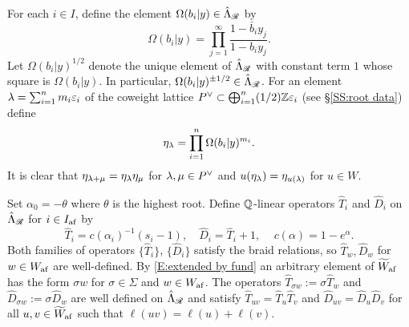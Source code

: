\documentclass[a4paper]{amsart}
\newcommand{\ike}[1]{\todo[size=\tiny,color=blue!30]{#1}}
\theoremstyle{remark}
\newtheorem{remark}[thm]{Remark}
\numberwithin{equation}{section}
\begin{document}
For each $i\in I$, define the element
$\Omega(b_i|y)\in\hat{\Lambda}_{\mathscr{R}}$ by
\begin{equation}
\Omega(b_i|y) =\prod_{j=1}^\infty \frac{1-\bar{b}_iy_j}{
1-b_i y_j
}.
\end{equation}
Let $\Omega(b_i| y)^{1/2}$ denote the unique element of
$\hat{\Lambda}_{\mathscr{R}}$ with constant term $1$ whose square is
$\Omega(b_i| y)$. 
In particular,
$\Omega(b_i| y)^{\pm 1/2}\in\hat{\Lambda}_{\mathscr{R}}$.
For an element $\lambda=\sum_{i=1}^n m_i \varepsilon_i$ of the coweight lattice $P^\lor\subset \bigoplus_{i=1}^n (1/2) \mathbb{Z} \varepsilon_i$ 
(see \S \ref{SS:root data}) define 
\begin{align}
  \eta_{\lambda} = \prod_{i=1}^n \Omega(b_i| y)^{m_i}.
\end{align}
It is clear that $\eta_{\lambda+\mu} = \eta_{\lambda} \eta_{\mu}$ for $\lambda,\mu\in P^\lor$
and $u(\eta_{\lambda})=\eta_{u(\lambda)}$ for $u\in W$.




Set $\alpha_0=-\theta$ where $\theta$ is the highest root.
Define $\mathbb{Q}$-linear operators $\hat{T}_i$ and
$\hat{D}_i$ on $\hat{\Lambda}_{\mathscr{R}}$ for $i\in I_{\mathrm{af}}$ by
\begin{equation}\label{E:TDc}
\hat{T}_i=c(\alpha_i)^{-1}(s_i-1),\quad
\hat{D}_i=\hat{T}_i+1,\,\quad  c(\alpha)=1-e^{\alpha}.
\end{equation}
Both families of operators 
$\{\hat{T}_i\}$, $\{\hat{D}_i\}$ satisfy the braid relations, so $\hat{T}_w, \hat{D}_w$ for $w\in W_{\mathrm{af}}$ are well-defined. By 
\eqref{E:extended by fund} an arbitrary element of $\widetilde{W}_{\mathrm{af}}$ has the form
$\sigma w$ for $\sigma\in\Sigma$ and $w\in W_{\mathrm{af}}$.
The operators $\hat{T}_{\sigma w}:=\sigma\hat{T}_w$ and $\hat{D}_{\sigma w}:=\sigma\hat{D}_w$
are well defined on $\hat{\Lambda}_{\mathscr{R}}$ and satisfy $\hat{T}_{uv}=\hat{T}_u\hat{T}_v$ and
$\hat{D}_{uv}=\hat{D}_u\hat{D}_v$ for all $u,v\in\widetilde{W}_{\mathrm{af}}$ such that $\ell(uv)=\ell(u)+\ell(v)$.
\end{document}
